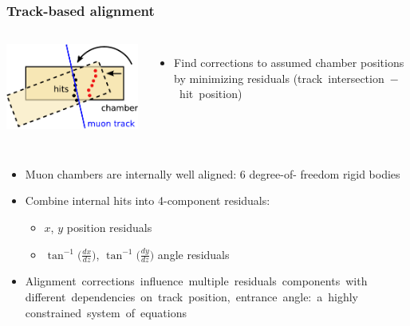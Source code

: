 \documentclass[compress]{beamer}
\begin{document}
\begin{frame}
\frametitle{Track-based alignment}

\begin{columns}
\includegraphics[width=\linewidth]{track_based_alignment.pdf}

\begin{itemize}
\item Find corrections to assumed chamber positions by minimizing residuals \mbox{(track intersection $-$ hit position)}
\end{itemize}
\end{columns}

\vfill
\begin{columns}
\begin{itemize}
\item Muon chambers are internally well aligned: 6 degree-of- freedom rigid bodies
\item Combine internal hits into 4-component residuals:
\begin{itemize}\setlength{\itemsep}{0.2 cm}
\item $x$, $y$ position residuals
\item $\tan^{-1} \big(\frac{dx}{dz}\big)$, $\tan^{-1} \big(\frac{dy}{dz}\big)$ angle residuals
\end{itemize}
\item \mbox{Alignment corrections influence multiple residuals components with\hspace{-10 cm}} \\ \mbox{different dependencies on track position, entrance angle: a highly\hspace{-10 cm}} \\ \mbox{constrained system of equations\hspace{-10 cm}}
\end{itemize}


\end{columns}
\end{frame}
\end{document}
